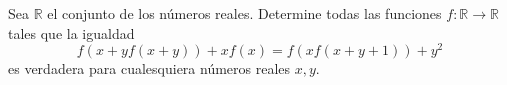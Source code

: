 Sea $\mathbb R$ el conjunto de los números reales. Determine todas las funciones $f: \mathbb R \to \mathbb R$ tales que la igualdad
\[f(x+yf(x+y))+xf(x)=f(xf(x+y+1))+y^2\]
es verdadera para cualesquiera números reales $x,y$.